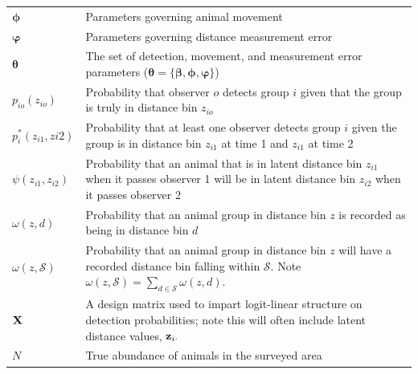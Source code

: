 \documentclass[aoas,preprint]{imsart}
\numberwithin{equation}{section}
\theoremstyle{plain}
\begin{document}
\begin{table}[ht]
\begin{tabular}{p{2cm}p{13cm}}
  $\boldsymbol{\phi}$ & Parameters governing animal movement \\
  $\boldsymbol{\varphi}$ & Parameters governing distance measurement error \\
  $\boldsymbol{\theta}$ & The set of detection, movement, and measurement error parameters ($\boldsymbol{\theta} = \{ \boldsymbol{\beta},\boldsymbol{\phi},\boldsymbol{\varphi} \}$) \\
  $p_{io}(z_{io})$ & Probability that observer $o$ detects group $i$ given that the group is truly in distance bin $z_{io}$\\
  $p_i^*(z_{i1},z{i2})$ & Probability that at least one observer detects group $i$ given the group is in distance bin $z_{i1}$ at time 1 and $z_{i1}$ at time 2\\
  $\psi(z_{i1},z_{i2})$ & Probability that an animal that is in latent distance bin $z_{i1}$ when it passes observer 1 will be in latent distance bin $z_{i2}$ when it passes observer 2 \\
  $\omega(z,d)$ & Probability that an animal group in distance bin $z$ is recorded as being in distance bin $d$ \\
  $\omega(z,\mathcal{S})$ & Probability that an animal group in distance bin $z$ will have a recorded distance bin falling within $\mathcal{S}$.  Note $\omega(z,\mathcal{S}) = \sum_{d \in \mathcal{S}} \omega(z,d)$. \\
  ${\bf X}$ & A design matrix used to impart logit-linear structure on detection probabilities; note this will often include latent distance values, ${\bf z}_{i \cdot}$  \\
  $N$ & True abundance of animals in the surveyed area \\
\hline
\end{tabular}
\\
\end{table}
\end{document}
